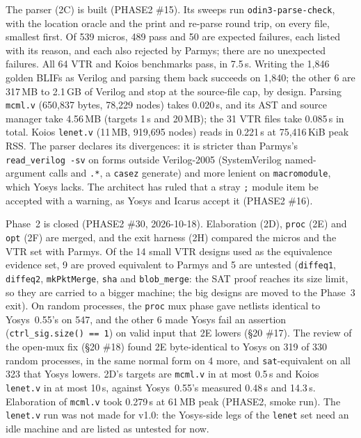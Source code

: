 \documentclass[conference]{IEEEtran}
\newcommand{\code}[1]{\texttt{#1}}
\begin{document}
The parser (2C) is built (PHASE2 \#15). Its sweeps run \code{odin3-parse-check}, with the
location oracle and the print and re-parse round trip, on every file, smallest first. Of 539
micros, 489 pass and 50 are expected failures, each listed with its reason, and each also
rejected by Parmys; there are no unexpected failures. All 64 VTR and Koios benchmarks pass, in
7.5\,s. Writing the 1,846 golden BLIFs as Verilog and parsing them back succeeds on 1,840; the
other 6 are 317\,MB to 2.1\,GB of Verilog and stop at the source-file cap, by design. Parsing
\code{mcml.v} (650,837 bytes, 78,229 nodes) takes 0.020\,s, and its AST and source manager take
4.56\,MB (targets 1\,s and 20\,MB); the 31 VTR files take 0.085\,s in total. Koios
\code{lenet.v} (11\,MB, 919,695 nodes) reads in 0.221\,s at 75,416\,KiB peak RSS. The parser
declares its divergences: it is stricter than Parmys's \code{read\_verilog -sv} on forms
outside Verilog-2005 (SystemVerilog named-argument calls and \code{.*}, a \code{casez}
generate) and more lenient on \code{macromodule}, which Yosys lacks. The architect has ruled that a stray \code{;} module item be accepted
with a warning, as Yosys and Icarus accept it (PHASE2 \#16).

Phase~2 is closed (PHASE2 \#30, 2026-10-18). Elaboration (2D), \code{proc} (2E) and \code{opt}
(2F) are merged, and the exit harness (2H) compared the micros and the VTR set with Parmys.
Of the 14 small VTR designs used as the equivalence evidence set, 9 are proved equivalent to
Parmys and 5 are untested (\code{diffeq1}, \code{diffeq2}, \code{mkPktMerge}, \code{sha} and \code{blob\_merge}: the SAT proof
reaches its size limit, so they are carried to a bigger machine; the big designs are moved to the
Phase~3 exit). On random processes, the \code{proc} mux phase gave
netlists identical to Yosys~0.55's on 547, and the other 6 made Yosys fail an assertion
(\code{ctrl\_sig.size() == 1}) on valid input that 2E lowers (\S20 \#17). The review of the
open-mux fix (\S20 \#18) found 2E byte-identical to Yosys on 319 of 330 random processes, in the
same normal form on 4 more, and \code{sat}-equivalent on all 323 that Yosys lowers. 2D's targets
are \code{mcml.v} in at most 0.5\,s and Koios \code{lenet.v} in at most 10\,s, against
Yosys~0.55's measured 0.48\,s and 14.3\,s. Elaboration of \code{mcml.v} took 0.279\,s at
61\,MB peak (PHASE2, smoke run). The \code{lenet.v} run was not made for v1.0: the Yosys-side
legs of the \code{lenet} set need an idle machine and are listed as untested for now.
\end{document}
